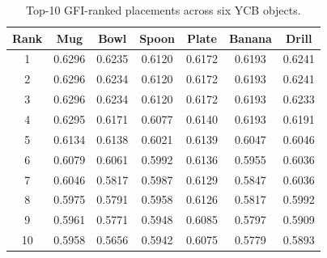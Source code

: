 \begin{table}[t]
\centering
\caption{Top-10 GFI-ranked placements across six YCB objects.}
\label{tab:top10_gfi}
\small
\setlength{\tabcolsep}{5pt}
\begin{tabular}{ccccccc}
\hline
Rank & Mug & Bowl & Spoon & Plate & Banana & Drill \\
\hline
1 & 0.6296 & 0.6235 & 0.6120 & 0.6172 & 0.6193 & 0.6241 \\
2 & 0.6296 & 0.6234 & 0.6120 & 0.6172 & 0.6193 & 0.6241 \\
3 & 0.6296 & 0.6234 & 0.6120 & 0.6172 & 0.6193 & 0.6233 \\
4 & 0.6295 & 0.6171 & 0.6077 & 0.6140 & 0.6193 & 0.6191 \\
5 & 0.6134 & 0.6138 & 0.6021 & 0.6139 & 0.6047 & 0.6046 \\
6 & 0.6079 & 0.6061 & 0.5992 & 0.6136 & 0.5955 & 0.6036 \\
7 & 0.6046 & 0.5817 & 0.5987 & 0.6129 & 0.5847 & 0.6036 \\
8 & 0.5975 & 0.5791 & 0.5958 & 0.6126 & 0.5817 & 0.5992 \\
9 & 0.5961 & 0.5771 & 0.5948 & 0.6085 & 0.5797 & 0.5909 \\
10 & 0.5958 & 0.5656 & 0.5942 & 0.6075 & 0.5779 & 0.5893 \\
\hline
\end{tabular}
\end{table}
